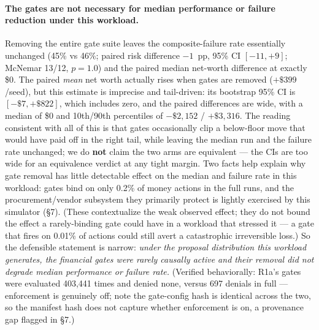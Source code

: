\documentclass[11pt]{article}
\begin{document}
\paragraph{The gates are not necessary for median performance or failure
reduction under this workload.} Removing the entire gate suite leaves the
composite-failure rate essentially unchanged (45\% vs 46\%; paired risk
difference $-1$~pp, 95\% CI $[-11,+9]$; McNemar 13/12, $p=1.0$) and the paired
median net-worth difference at exactly \$0. The paired \emph{mean} net worth
actually rises when gates are removed ($+\$399$/seed), but this estimate is
imprecise and tail-driven: its bootstrap 95\% CI is $[-\$7,+\$822]$, which
includes zero, and the paired differences are wide, with a median of \$0 and
10th/90th percentiles of $-\$2,152$ / $+\$3,316$. The reading consistent with
all of this is that gates occasionally clip a below-floor move that would have
paid off in the right tail, while leaving the median run and the failure rate
unchanged; we do \textbf{not} claim the two arms are equivalent --- the CIs are
too wide for an equivalence verdict at any tight margin. Two facts help explain
why gate removal has little detectable effect on the median and failure rate in
this workload: gates bind on only 0.2\% of money actions in the full runs, and
the procurement/vendor subsystem they primarily protect is lightly exercised by
this simulator (\S7). (These contextualize the weak observed effect; they do
not bound the effect a rarely-binding gate could have in a workload that
stressed it --- a gate that fires on 0.01\% of actions could still avert a
catastrophic irreversible loss.) So the defensible statement is narrow:
\emph{under the proposal distribution this workload generates, the financial
gates were rarely causally active and their removal did not degrade median
performance or failure rate.} (Verified behaviorally: R1a's gates were
evaluated 403,441 times and denied none, versus 697 denials in full ---
enforcement is genuinely off; note the gate-config hash is identical across the
two, so the manifest hash does not capture whether enforcement is on, a
provenance gap flagged in \S7.)
\end{document}
